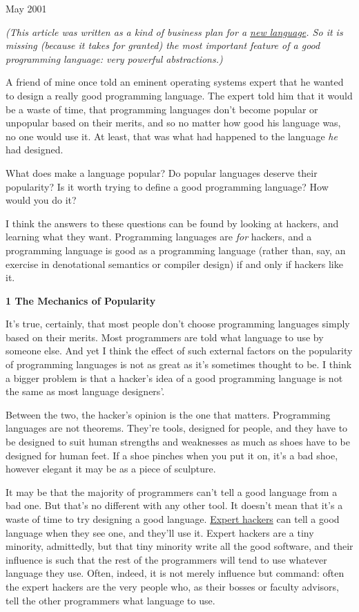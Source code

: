 May 2001

\emph{(This article was written as a kind of business plan for a
\href{arc.html}{new language}. So it is missing (because it takes for
granted) the most important feature of a good programming language: very
powerful abstractions.)}

A friend of mine once told an eminent operating systems expert that he
wanted to design a really good programming language. The expert told him
that it would be a waste of time, that programming languages don't
become popular or unpopular based on their merits, and so no matter how
good his language was, no one would use it. At least, that was what had
happened to the language \emph{he} had designed.

What does make a language popular? Do popular languages deserve their
popularity? Is it worth trying to define a good programming language?
How would you do it?

I think the answers to these questions can be found by looking at
hackers, and learning what they want. Programming languages are
\emph{for} hackers, and a programming language is good as a programming
language (rather than, say, an exercise in denotational semantics or
compiler design) if and only if hackers like it.

\textbf{1 The Mechanics of Popularity}

It's true, certainly, that most people don't choose programming
languages simply based on their merits. Most programmers are told what
language to use by someone else. And yet I think the effect of such
external factors on the popularity of programming languages is not as
great as it's sometimes thought to be. I think a bigger problem is that
a hacker's idea of a good programming language is not the same as most
language designers'.

Between the two, the hacker's opinion is the one that matters.
Programming languages are not theorems. They're tools, designed for
people, and they have to be designed to suit human strengths and
weaknesses as much as shoes have to be designed for human feet. If a
shoe pinches when you put it on, it's a bad shoe, however elegant it may
be as a piece of sculpture.

It may be that the majority of programmers can't tell a good language
from a bad one. But that's no different with any other tool. It doesn't
mean that it's a waste of time to try designing a good language.
\href{design.html}{Expert hackers} can tell a good language when they
see one, and they'll use it. Expert hackers are a tiny minority,
admittedly, but that tiny minority write all the good software, and
their influence is such that the rest of the programmers will tend to
use whatever language they use. Often, indeed, it is not merely
influence but command: often the expert hackers are the very people who,
as their bosses or faculty advisors, tell the other programmers what
language to use.

